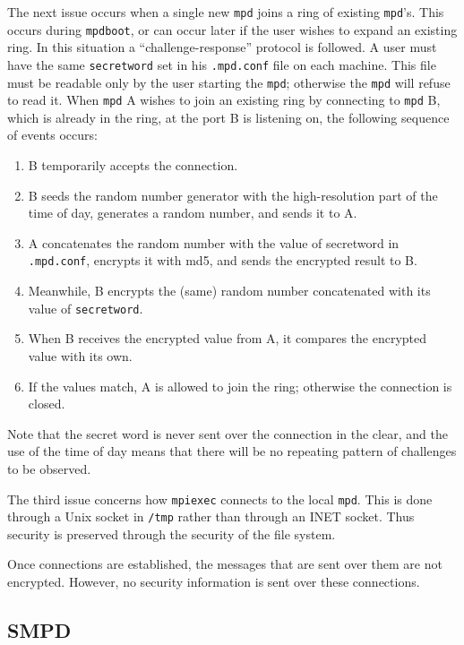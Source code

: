 \documentclass[dvipdfm,11pt]{article}
\begin{document}
The next issue occurs when a single new \texttt{mpd} joins a ring of
existing \texttt{mpd}'s.  This occurs during \texttt{mpdboot}, or can
occur later if the user wishes to expand an existing ring.  In this
situation a ``challenge-response'' protocol is followed.  A user must
have the same \texttt{secretword} set in his \texttt{.mpd.conf} file on
each machine.  This file must be readable only by the user starting the
\texttt{mpd}; otherwise the \texttt{mpd} will refuse to read it.  When
\texttt{mpd} A wishes to join an existing ring by connecting to
\texttt{mpd} B, which is already in the ring, at the port B is listening
on, the following sequence of events occurs:
\begin{enumerate}
\item B temporarily accepts the connection.
\item B seeds the random number generator with the high-resolution part
  of the time of day, generates a random number, and sends it to A.
\item A concatenates the random number with the value of secretword in
  \texttt{.mpd.conf}, encrypts it with md5, and sends the encrypted
  result to B.
\item Meanwhile, B encrypts the (same) random number concatenated with
  its value of \texttt{secretword}.
\item When B receives the encrypted value from A, it compares the
  encrypted value with its own.
\item If the values match, A is allowed to join the ring; otherwise the
  connection is closed.
\end{enumerate}
Note that the secret word is never sent over the connection in the clear,
and the use of the time of day means that there will be no repeating
pattern of challenges to be observed.  

The third issue concerns how \texttt{mpiexec} connects to the local
\texttt{mpd}.  This is done through a Unix socket in \texttt{/tmp} rather than
through an INET socket.  Thus security is preserved through the security
of the file system.

Once connections are established, the messages that are sent over them
are not encrypted.  However, no security information is sent over these
connections. 

\subsection{SMPD}
\label{sec:smpd}
\end{document}
